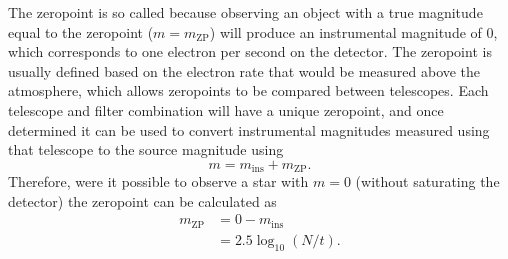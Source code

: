 \begin{colsection}
The zeropoint is so called because observing an object with a true magnitude equal to the zeropoint ($m = m_\text{ZP}$) will produce an instrumental magnitude of 0, which corresponds to one electron per second on the detector. The zeropoint is usually defined based on the electron rate that would be measured above the atmosphere, which allows zeropoints to be compared between telescopes. Each telescope and filter combination will have a unique zeropoint, and once determined it can be used to convert instrumental magnitudes measured using that telescope to the source magnitude using
%
\begin{equation}
    m = m_\text{ins} + m_\text{ZP}.
    \label{eq:zp}
\end{equation}
%
Therefore, were it possible to observe a star with $m=0$ (without saturating the detector) the zeropoint can be calculated as
%
\begin{equation}
    \begin{split}
        m_\text{ZP} & = 0 - m_\text{ins} \\
                    & = 2.5 \log_{10}(N/t).
    \end{split}
    \label{eq:zp2}
\end{equation}

\newpage

\end{colsection}

